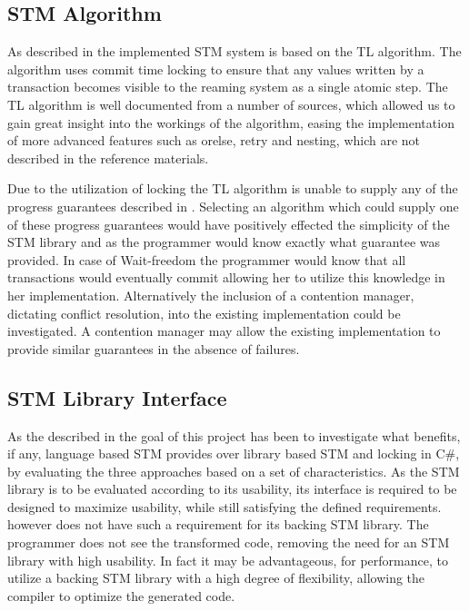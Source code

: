\subsection{STM Algorithm}
As described in  the implemented \ac{STM} system is based on the TL algorithm\cite{dice2006transactional}. The algorithm uses commit time locking to ensure that any values written by a transaction becomes visible to the reaming system as a single atomic step. The TL algorithm is well documented from a number of sources\cite{dice2006transactional}\cite[p. 438]{herlihy2012art}\cite[p. 106]{harris2010transactional}, which allowed us to gain great insight into the workings of the algorithm, easing the implementation of more advanced features such as orelse, retry and nesting, which are not described in the reference materials.

Due to the utilization of locking the TL algorithm is unable to supply any of the progress guarantees described in . Selecting an algorithm which could supply one of these progress guarantees would have positively effected the simplicity of the \ac{STM} library and \stmname as the programmer would know exactly what guarantee was provided. In case of Wait-freedom the programmer would know that all transactions would eventually commit allowing her to utilize this knowledge in her implementation. Alternatively the inclusion of a contention manager, dictating conflict resolution, into the existing implementation could be investigated. A contention manager may allow the existing implementation to provide similar guarantees in the absence of failures.
\subsection{STM Library Interface}
As the described in  the goal of this project has been to investigate what benefits, if any, language based \ac{STM} provides over library based \ac{STM} and locking in C\#, by evaluating the three approaches based on a set of characteristics. As the \ac{STM} library is to be evaluated according to its usability, its interface is required to be designed to maximize usability, while still satisfying the defined requirements. \stmname however does not have such a requirement for its backing \ac{STM} library. The programmer does not see the transformed code, removing the need for an \ac{STM} library with high usability. In fact it may be advantageous, for performance, to utilize a backing \ac{STM} library with a high degree of flexibility, allowing the compiler to optimize the generated code. 

